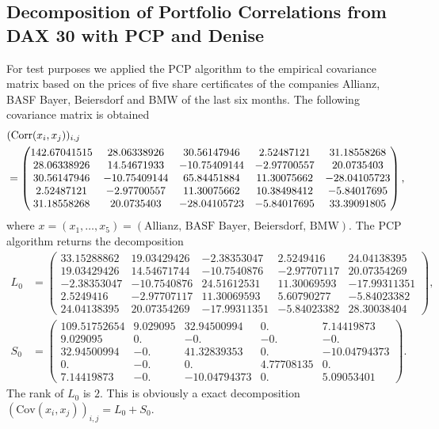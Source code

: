 \subsection{Decomposition of Portfolio Correlations from DAX 30 with PCP and Denise}
For test purposes we applied the PCP algorithm to the empirical covariance matrix based on the prices of five share certificates of the companies Allianz, BASF Bayer, Beiersdorf and BMW  of the last six months. The following covariance matrix is obtained
\begin{align}
 &(\mathrm{Corr}(x_i,x_j))_{i,j} \notag \\
 &= \begin{pmatrix} 142.67041515&  28.06338926&  30.56147946&   2.52487121&
         31.18558268\\  28.06338926&  14.54671933& -10.75409144&  -2.97700557&
         20.0735403 \\  30.56147946& -10.75409144&  65.84451884&  11.30075662&
        -28.04105723\\   2.52487121&  -2.97700557&  11.30075662&  10.38498412&
         -5.84017695\\  31.18558268&  20.0735403 & -28.04105723&  -5.84017695&
         33.39091805 \end{pmatrix},
\end{align}
where $x = (x_1,\dots,x_5) =(\text{Allianz, BASF Bayer, Beiersdorf, BMW})$. The PCP algorithm returns the decomposition
\begin{align}
 L_0 &= \begin{pmatrix}
       33.15288862&  19.03429426&  -2.38353047&   2.5249416 &
         24.04138395\\
         19.03429426&  14.54671744& -10.7540876 &  -2.97707117&
         20.07354269\\
         -2.38353047& -10.7540876 &  24.51612531&  11.30069593&
        -17.99311351\\ 
        2.5249416 &  -2.97707117&  11.30069593&   5.60790277&
         -5.84023382\\
         24.04138395&  20.07354269& -17.99311351&  -5.84023382&
         28.30038404
       \end{pmatrix},
       \\
S_0 &=\begin{pmatrix}109.51752654&   9.029095  &  32.94500994&   0.        &
          7.14419873\\ 9.029095  &   0.        &  -0.        &  -0.        &
         -0.\\ 32.94500994&  -0.        &  41.32839353&   0.        &
        -10.04794373 \\ 0.        &  -0.        &   0.        &   4.77708135&
          0.        \\ 7.14419873&  -0.        & -10.04794373&   0.        &
          5.09053401
       \end{pmatrix}.
\end{align}
The rank of $L_0$ is $2$. This is obviously a exact decomposition $(\mathrm{Cov}(x_i,x_j))_{i,j} = L_0 + S_0$.
